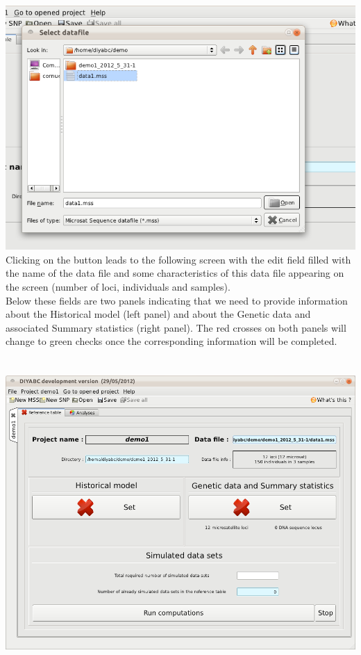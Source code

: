 \includegraphics[scale=0.35]{gui_pictures/Capture-DIYABC-9} \\
 Clicking on the  button leads to the following
screen with the edit field filled with the name of the data file and
some characteristics of this data file appearing on the screen (number
of loci, individuals and samples).\\
 Below these fields are two panels indicating that we need to provide
information about the Historical model (left panel) and about the
Genetic data and associated Summary statistics (right panel). The
red crosses on both panels will change to green checks once the corresponding
information will be completed.\\
 \\
 \\
 \includegraphics[scale=0.35]{gui_pictures/Capture-DIYABC-10} \newpage{}


